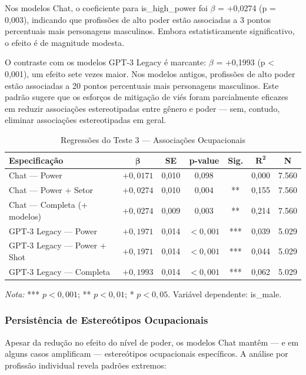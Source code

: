 \documentclass[12pt,a4paper]{article}
\begin{document}
Nos modelos Chat, o coeficiente para is\_high\_power foi $\beta$ = +0,0274 (p =
0,003), indicando que profissões de alto poder estão associadas a 3
pontos percentuais mais personagens masculinos. Embora estatisticamente
significativo, o efeito é de magnitude modesta.

O contraste com os modelos GPT-3 Legacy é marcante: $\beta$ = +0,1993 (p <
0,001), um efeito sete vezes maior. Nos modelos antigos, profissões de
alto poder estão associadas a 20 pontos percentuais mais personagens
masculinos. Este padrão sugere que os esforços de mitigação de viés
foram parcialmente eficazes em reduzir associações estereotipadas entre
gênero e poder --- sem, contudo, eliminar associações estereotipadas em
geral.

\begin{table}[H]
\centering
\caption{Regressões do Teste 3 --- Associações Ocupacionais}
\label{tab:reg-teste3}
\begin{tabular}{lcccccc}
\toprule
\textbf{Especificação} & $\boldsymbol{\beta}$ & \textbf{SE} & \textbf{p-value} & \textbf{Sig.} & $\boldsymbol{R^2}$ & \textbf{N} \\
\midrule
Chat --- Power & $+0,0171$ & 0,010 & 0,098 & & 0,000 & 7.560 \\
Chat --- Power + Setor & $+0,0274$ & 0,010 & 0,004 & ** & 0,155 & 7.560 \\
Chat --- Completa (+ modelos) & $+0,0274$ & 0,009 & 0,003 & ** & 0,214 & 7.560 \\
GPT-3 Legacy --- Power & $+0,1971$ & 0,014 & $<0,001$ & *** & 0,039 & 5.029 \\
GPT-3 Legacy --- Power + Shot & $+0,1971$ & 0,014 & $<0,001$ & *** & 0,044 & 5.029 \\
GPT-3 Legacy --- Completa & $+0,1993$ & 0,014 & $<0,001$ & *** & 0,062 & 5.029 \\
\bottomrule
\end{tabular}

\smallskip
\footnotesize\textit{Nota:} *** $p < 0,001$; ** $p < 0,01$; * $p < 0,05$. Variável dependente: is\_male.
\end{table}


\subsubsection{Persistência de Estereótipos Ocupacionais}


Apesar da redução no efeito do nível de poder, os modelos Chat mantêm
--- e em alguns casos amplificam --- estereótipos ocupacionais
específicos. A análise por profissão individual revela padrões extremos:
\end{document}
